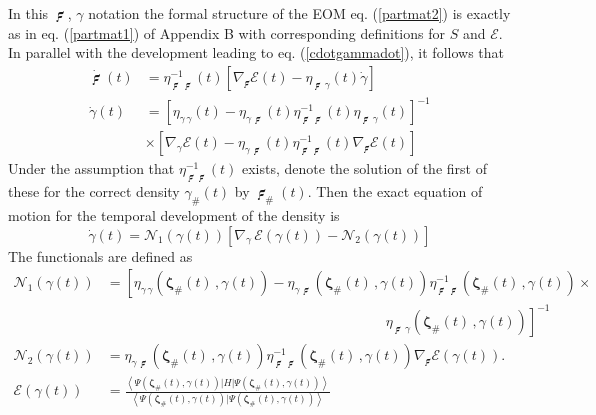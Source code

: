 \documentclass[aps,preprint]{revtex4}%
\begin{document}
In this $\mathbf{{\digamma}}$, $\gamma$ notation the formal structure of the
EOM eq. (\ref{partmat2}) is exactly as in eq. (\ref{partmat1}) of Appendix B
with corresponding definitions for $S$ and $\mathcal{E}$. In parallel with the
development leading to eq. (\ref{cdotgammadot}), it follows that
\begin{align}
\dot{\mathbf{\digamma}}(t)  &  =\eta_{\mathbf{\digamma\,\digamma}}%
^{-1}(t)\left[  \nabla_{\mathbf{\digamma}}\mathcal{E}(t)-\eta
_{\mathbf{\digamma}\,\gamma}(t)\dot{\gamma}\right] \nonumber\\
\dot{\gamma}(t)  &  =\left[  \eta_{\gamma\,\gamma}(t)-\eta_{\gamma
\,\mathbf{\digamma}}(t)\eta_{\mathbf{\digamma}\,\mathbf{\digamma}}^{-1}%
(t)\eta_{\mathbf{\digamma}\,\gamma}(t)\right]  ^{-1}\nonumber\\
&  \times\left[  \nabla_{\gamma}\mathcal{E}(t)-\eta_{\gamma\,\mathbf{\digamma
}}(t)\eta_{\mathbf{\digamma}\,\mathbf{\digamma}}^{-1}(t)\nabla
_{\mathbf{\digamma}}\mathcal{E}(t)\right]
\end{align}
Under the assumption that $\eta_{\mathbf{\digamma\digamma}}^{-1}(t)$ exists,
denote the solution of the first of these for the correct density $\gamma
_{\#}(t)$ by $\mathbf{\digamma}_{\#}(t)$. Then the exact equation of motion
for the temporal development of the density is
\begin{equation}
\dot{\gamma}(t)=\mathcal{N}_{1}(\gamma(t))\left[  \nabla_{\gamma}%
\,\mathcal{E}(\gamma(t))-\mathcal{N}_{2}(\gamma(t))\right]
\end{equation}
The functionals are defined as
\begin{align}
\mathcal{N}_{1}(\gamma(t))  &  =\left[  \eta_{\gamma\,\gamma}(\mathbf{\zeta
}_{\#}(t)\,,\gamma(t))-\eta_{\gamma\,\mathbf{\digamma}}(\mathbf{\zeta}%
_{\#}(t)\,,\gamma(t))\eta_{\mathbf{\digamma}\,\mathbf{\digamma}}%
^{-1}(\mathbf{\zeta}_{\#}(t)\,,\gamma(t))\right.  \times\nonumber\\
&  \qquad\qquad\qquad\qquad\qquad\qquad\qquad\qquad\qquad\qquad\left.
\eta_{\mathbf{\digamma}\,\gamma}(\mathbf{\zeta}_{\#}(t)\,,\gamma(t))\right]
^{-1}\\
\mathcal{N}_{2}\left(  \gamma(t)\right)   &  = \eta_{\gamma\,\mathbf{\digamma
}}(\mathbf{\zeta}_{\#}(t)\,,\gamma(t))\eta_{\mathbf{\digamma}%
\,\mathbf{\digamma}}^{-1}(\mathbf{\zeta}_{\#}(t)\,,\gamma(t))\nabla
_{\mathbf{\digamma}}\mathcal{E}(\gamma(t)).\quad\\
\mathcal{E}(\gamma(t))  &  =\frac{\left\langle \Psi(\mathbf{\zeta}%
_{\#}(t),\gamma(t))|H|\Psi(\mathbf{\zeta}_{\#}(t),\gamma(t))\right\rangle
}{\left\langle \Psi(\mathbf{\zeta}_{\#}(t),\gamma(t))|\Psi(\mathbf{\zeta}%
_{\#}(t),\gamma(t))\right\rangle }%
\end{align}
\end{document}
